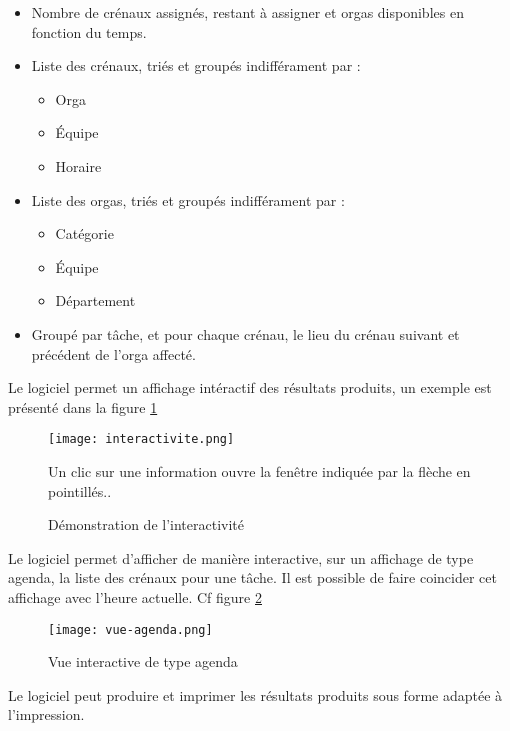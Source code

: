 \begin{itemize}
\item Nombre de crénaux assignés, restant à assigner et orgas disponibles en fonction du temps.
\item Liste des crénaux, triés et groupés indifférament par : 	\begin{itemize}
								  \item Orga
								  \item Équipe
								  \item Horaire
								 \end{itemize}
\item Liste des orgas, triés et groupés indifférament par :  	\begin{itemize}
								  \item Catégorie
								  \item Équipe
								  \item Département
								 \end{itemize}
\item Groupé par tâche, et pour chaque crénau, le lieu du crénau suivant et précédent de l'orga affecté.

\end{itemize}



Le logiciel permet un affichage intéractif des résultats produits, un exemple est présenté dans la figure \ref{fig:interactivite}

\begin{figure}[h!t]
\centering
\texttt{[image: interactivite.png]}

Un clic sur une information ouvre la fenêtre indiquée par la flèche en pointillés..
\caption{Démonstration de l'interactivité}
\label{fig:interactivite}
\end{figure}


Le logiciel permet d'afficher de manière interactive, sur un affichage de type agenda, la liste des crénaux pour une tâche. Il est possible de faire coincider cet affichage avec l'heure actuelle.
Cf figure \ref{fig:agenda}

\begin{figure}[h!t]
\centering
\texttt{[image: vue-agenda.png]}

\caption{Vue interactive de type agenda}
\label{fig:agenda}
\end{figure}


Le logiciel peut produire et imprimer les résultats produits sous forme adaptée à l'impression.